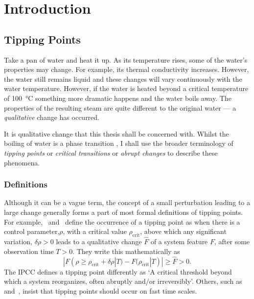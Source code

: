 \chapter{Introduction}
\graphicspath{{introduction/figs}}
\label{sec:introduction}

\section{Tipping Points}
Take a pan of water and heat it up. As its temperature rises, some of the water's properties may change. For example, its thermal conductivity increases.
However, the water still remains liquid and these changes will vary continuously with the water temperature. However, if the water is heated beyond
a critical temperature of \SI{100}{\degreeCelsius} something more dramatic happens and the water boils away. The properties of the resulting steam are quite different
to the original water --- a \emph{qualitative} change has occurred.

It is qualitative change that this thesis shall be concerned with. Whilst the boiling of water is a phase transition \parencite{Goldenfeld1992}, I shall use the broader terminology
of \emph{tipping points} \parencite{Lenton2008} or \emph{critical transitions} \parencite{Rahmstorf1995} or \emph{abrupt changes} \parencite{Alley2003} to describe these phenomena. 
\subsection{Definitions}

Although it can be a vague term, the concept of a small perturbation leading to a large change generally forms a part of most formal definitions of tipping points.
For example,~\cite{Lenton2008} and~\cite{ArmstrongMcKay2022} define the occurrence of a tipping
point as when there is a control parameter,$\rho$, with a critical value $\rho_{\mathrm{crit}}$, above which any significant variation, $\delta \rho > 0$
leads to a qualitative change $\hat{F}$ of a system feature $F$, after some observation time $T > 0$. They write this mathematically as
\begin{equation}
  \label{eq:lenton_tipping_definition}
  |F(\rho \geq \rho_{\mathrm{crit}} + \delta \rho | T) - F(\rho_{\mathrm{crit}} | T)| \geq \hat{F} > 0.
\end{equation}
The IPCC \parencite{AR6} defines a tipping point differently as `A critical threshold beyond which a system reorganizes, often abruptly and/or irreversibly'. Others,
such as~\cite{Wang2023} and~\cite{Kopp2016}, insist that tipping points should occur on fast time scales.

